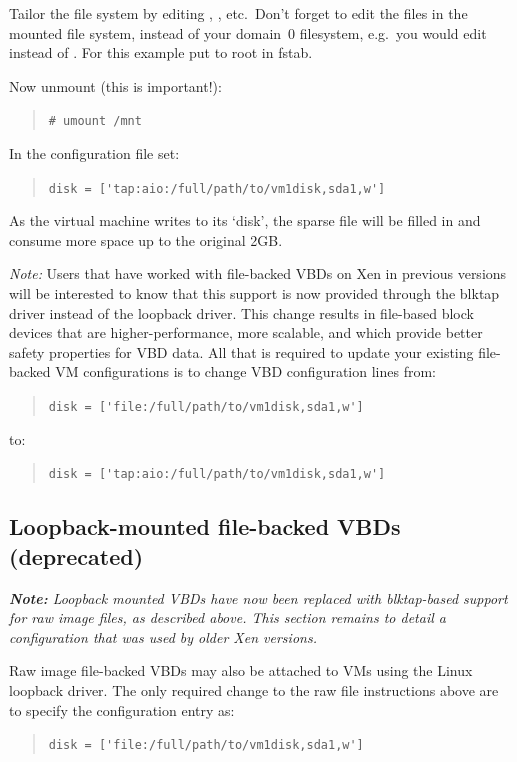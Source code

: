 \documentclass[11pt,twoside,final,openright]{report}
\begin{document}
Tailor the file system by editing ,
, etc.\ Don't forget to edit the files in the
mounted file system, instead of your domain~0 filesystem, e.g.\ you
would edit  instead of .  For
this example put  to root in fstab.

Now unmount (this is important!):
\begin{quote}
  \verb_# umount /mnt_
\end{quote}

In the configuration file set:
\begin{quote}
  \verb_disk = ['tap:aio:/full/path/to/vm1disk,sda1,w']_
\end{quote}

As the virtual machine writes to its `disk', the sparse file will be
filled in and consume more space up to the original 2GB.

{\em{Note:}} Users that have worked with file-backed VBDs on Xen in previous
versions will be interested to know that this support is now provided through
the blktap driver instead of the loopback driver.  This change results in
file-based block devices that are higher-performance, more scalable, and which
provide better safety properties for VBD data.  All that is required to update
your existing file-backed VM configurations is to change VBD configuration
lines from:
\begin{quote}
  \verb_disk = ['file:/full/path/to/vm1disk,sda1,w']_
\end{quote}
to:
\begin{quote}
  \verb_disk = ['tap:aio:/full/path/to/vm1disk,sda1,w']_
\end{quote}


\subsection{Loopback-mounted file-backed VBDs (deprecated)}

{\em{{\bf{Note:}} Loopback mounted VBDs have now been replaced with
    blktap-based support for raw image files, as described above.  This
    section remains to detail a configuration that was used by older Xen
    versions.}}

Raw image file-backed VBDs may also be attached to VMs using the 
Linux loopback driver.  The only required change to the raw file 
instructions above are to specify the configuration entry as:
\begin{quote}
  \verb_disk = ['file:/full/path/to/vm1disk,sda1,w']_
\end{quote}
\end{document}
